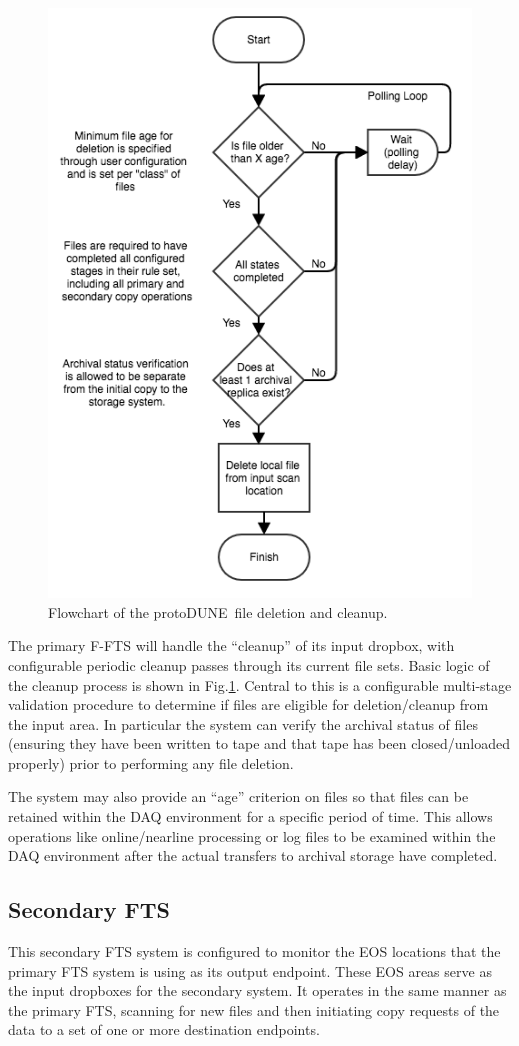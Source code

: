 \documentclass[pdftex,12pt,letter]{article}
\newcommand{\pd}{protoDUNE\ }
\begin{document}
\begin{figure}[tbh]
\centering\includegraphics[width=0.5\linewidth]{fts_file_deletion_flowchart.png}
\caption{\label{fig:ftscleanup}Flowchart of the \pd file deletion and cleanup.}
\end{figure}
The primary F-FTS will handle the “cleanup” of its input dropbox,
with configurable periodic cleanup passes through its current file sets.  Basic logic of the cleanup process is shown in Fig.\ref{fig:ftscleanup}.
Central to this is a configurable multi-stage validation procedure to determine if files are eligible for deletion/cleanup from the input area.
In particular the system can verify the archival status of files (ensuring they have been written to tape and that tape has been closed/unloaded properly)
prior to performing any file deletion.

The system may also provide an ``age'' criterion on files so that files can be retained within the DAQ environment for a specific period of time.
This allows operations like online/nearline processing or log files to be examined within the DAQ environment after the actual transfers to archival
storage have completed.



\subsection{Secondary FTS}
This secondary FTS system is configured to monitor the EOS locations that the primary FTS system is using as its output endpoint.
These EOS areas serve as the input dropboxes for the secondary system. It operates in the same manner as the primary FTS,
scanning for new files and then initiating copy requests of the data to a set of one or more destination endpoints.
\end{document}
